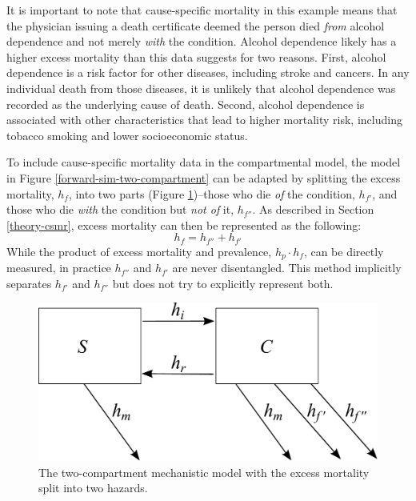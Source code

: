 It is important to note that cause-specific mortality in this example
means that the physician issuing a death certificate deemed the person
died \emph{from} alcohol dependence and not merely \emph{with} the
condition.  Alcohol dependence likely has a higher excess mortality
than this data suggests for two reasons.  First, alcohol dependence is
a risk factor for other diseases, including stroke and cancers.  In
any individual death from those diseases, it is unlikely that alcohol
dependence was recorded as the underlying cause of
death.\cite{TK_citation_needed} Second, alcohol dependence is
associated with other characteristics that lead to higher mortality
risk, including tobacco smoking and lower socioeconomic
status.\cite{TK_citation_needed}

To include cause-specific mortality data in the compartmental model,
the model in Figure \ref{forward-sim-two-compartment} can be adapted
by splitting the excess mortality, $h_{f}$, into two parts (Figure
\ref{fig:two_compartment_2f})--those who die \emph{of} the
condition, $h_{f'}$, and those who die \emph{with} the condition but
\emph{not of} it, $h_{f''}$.  As described in Section
\ref{theory-csmr}, excess mortality can then be represented as the
following:
    \begin{equation}
        h_{f} = h_{f''} + h_{f'}
    \end{equation}
While the product of excess mortality and prevalence, $h_{p} \cdot h_{f}$,
can be directly measured, in practice $h_{f''}$ and $h_{f'}$ are never
disentangled.  This method implicitly separates $h_{f'}$ and $h_{f''}$
but does not try to explicitly represent both.

    \begin{figure}[h]
        \begin{center}
            \includegraphics[width=\textwidth]{SC2.pdf}
            \caption{The two-compartment mechanistic model with the
              excess mortality split into two hazards.}
            \label{fig:two_compartment_2f}
        \end{center}
    \end{figure}

